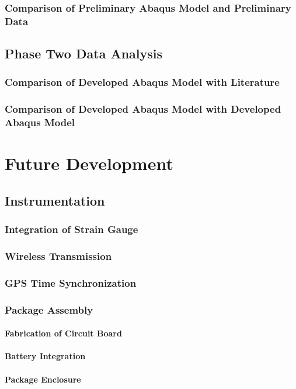 \documentclass[twoside,11pt]{report}
\begin{document}
		\subsection{Comparison of Preliminary Abaqus Model and Preliminary Data}
	\section{Phase Two Data Analysis}
		\subsection{Comparison of Developed Abaqus Model with Literature}
		\subsection{Comparison of Developed Abaqus Model with Developed Abaqus Model}
\chapter{Future Development}
	\section{Instrumentation}
		\subsection{Integration of Strain Gauge}
		\subsection{Wireless Transmission}
		\subsection{GPS Time Synchronization}
		\subsection{Package Assembly}
			\subsubsection{Fabrication of Circuit Board}
			\subsubsection{Battery Integration}
			\subsubsection{Package Enclosure}
\end{document}
